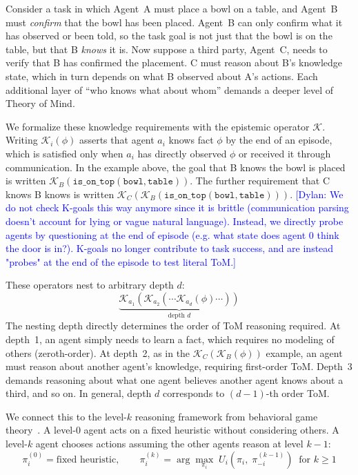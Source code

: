 \documentclass{article} %
\newcommand{\K}{\mathcal{K}}
\newcommand{\dylan}[1]{\textcolor{blue}{[Dylan: #1]}}
\begin{document}
Consider a task in which Agent~A must place a bowl on a table, and Agent~B must \emph{confirm} that the bowl has been placed. Agent~B can only confirm what it has observed or been told, so the task goal is not just that the bowl is on the table, but that B \emph{knows} it is. Now suppose a third party, Agent~C, needs to verify that B has confirmed the placement. C must reason about B's knowledge state, which in turn depends on what B observed about A's actions. Each additional layer of ``who knows what about whom'' demands a deeper level of Theory of Mind.

We formalize these knowledge requirements with the epistemic operator $\K$. Writing $\K_i(\phi)$ asserts that agent $a_i$ knows fact $\phi$ by the end of an episode, which is satisfied only when $a_i$ has directly observed $\phi$ or received it through communication. In the example above, the goal that B knows the bowl is placed is written $\K_B(\texttt{is\_on\_top}(\texttt{bowl}, \texttt{table}))$. The further requirement that C knows B knows is written $\K_C(\K_B(\texttt{is\_on\_top}(\texttt{bowl}, \texttt{table})))$. \dylan{We do not check K-goals this way anymore since it is brittle (communication parsing doesn't account for lying or vague natural language). Instead, we directly probe agents by questioning at the end of episode (e.g. what state does agent 0 think the door is in?). K-goals no longer contribute to task success, and are instead "probes" at the end of the episode to test literal ToM.}

These operators nest to arbitrary depth $d$:
%
\begin{equation}
  \underbrace{\K_{a_1}(\K_{a_2}(\cdots \K_{a_d}(\phi) \cdots))}_{\text{depth } d}
  \label{eq:tom_depth}
\end{equation}
%
The nesting depth directly determines the order of ToM reasoning required. At depth~1, an agent simply needs to learn a fact, which requires no modeling of others (zeroth-order). At depth~2, as in the $\K_C(\K_B(\phi))$ example, an agent must reason about another agent's knowledge, requiring first-order ToM. Depth~3 demands reasoning about what one agent believes another agent knows about a third, and so on. In general, depth $d$ corresponds to $(d{-}1)$-th order ToM.

We connect this to the level-$k$ reasoning framework from behavioral game theory~\citep{stahl1994experimental, camerer2004cognitive}. A level-0 agent acts on a fixed heuristic without considering others. A level-$k$ agent chooses actions assuming the other agents reason at level $k{-}1$:
%
\begin{equation}
  \pi^{(0)}_i = \text{fixed heuristic}, \qquad \pi^{(k)}_i = \arg\max_{\pi_i} \; U_i\!\left(\pi_i,\; \pi^{(k-1)}_{-i}\right) \;\; \text{for } k \geq 1
  \label{eq:level_k}
\end{equation}
%
\end{document}
